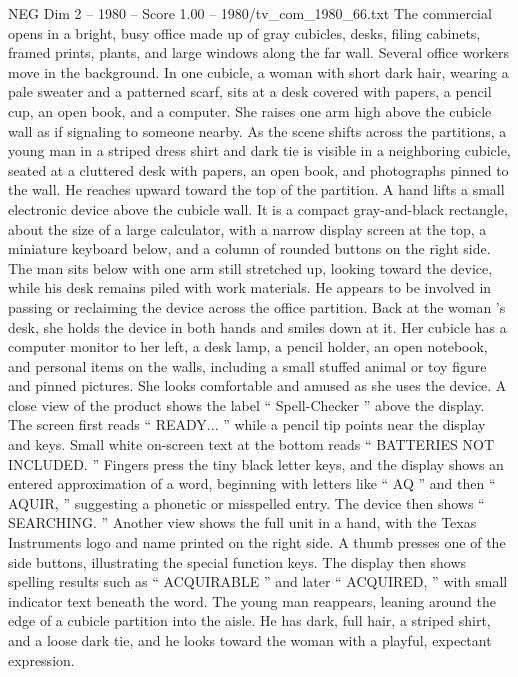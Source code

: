 \begin{textsample}{NEG Dim 2 – 1980 – Score 1.00 – 1980/tv\_com\_1980\_66.txt}  \label{ex:f2_neg_037}
The commercial opens in a bright, busy office made up of gray cubicles, desks, filing cabinets, framed prints, plants, and large windows along the far wall.
Several office workers move in the background.
In one cubicle, a woman with short dark hair, wearing a pale sweater and a patterned scarf, sits at a desk covered with papers, a pencil cup, an open book, and a computer.
She raises one arm high above the cubicle wall as if signaling to someone nearby.
As the scene shifts across the partitions, a young man in a striped dress shirt and dark tie is visible in a neighboring cubicle, seated at a cluttered desk with papers, an open book, and photographs pinned to the wall.
He reaches upward toward the top of the partition.
A hand lifts a small electronic device above the cubicle wall.
It is a compact gray-and-black rectangle, about the size of a large calculator, with a narrow display screen at the top, a miniature keyboard below, and a column of rounded buttons on the right side.
The man sits below with one arm still stretched up, looking toward the device, while his desk remains piled with work materials.
He appears to be involved in passing or reclaiming the device across the office partition.
Back at the woman ’s desk, she holds the device in both hands and smiles down at it.
Her cubicle has a computer monitor to her left, a desk lamp, a pencil holder, an open notebook, and personal items on the walls, including a small stuffed animal or toy figure and pinned pictures.
She looks comfortable and amused as she uses the device.
A close view of the product shows the label “ Spell-Checker ” above the display.
The screen first reads “ READY... ” while a pencil tip points near the display and keys.
Small white on-screen text at the bottom reads “ BATTERIES NOT INCLUDED. ” Fingers press the tiny black letter keys, and the display shows an entered approximation of a word, beginning with letters like “ AQ ” and then “ AQUIR, ” suggesting a phonetic or misspelled entry.
The device then shows “ SEARCHING. ” Another view shows the full unit in a hand, with the Texas Instruments logo and name printed on the right side.
A thumb presses one of the side buttons, illustrating the special function keys.
The display then shows spelling results such as “ ACQUIRABLE ” and later “ ACQUIRED, ” with small indicator text beneath the word.
The young man reappears, leaning around the edge of a cubicle partition into the aisle.
He has dark, full hair, a striped shirt, and a loose dark tie, and he looks toward the woman with a playful, expectant expression.

\end{textsample}
